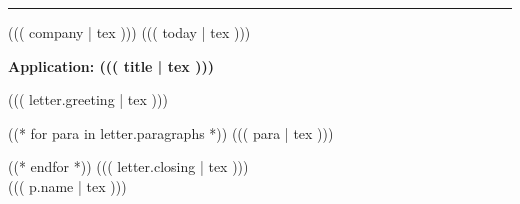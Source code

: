 \documentclass[a4paper,11pt]{article}
\begin{document}
\cvheader
\vspace{-6pt}\noindent\rule{\textwidth}{0.4pt}

\vspace{4pt}
((( company | tex ))) \hfill ((( today | tex )))

\vspace{6pt}
\textbf{Application: ((( title | tex )))}

\vspace{4pt}
((( letter.greeting | tex )))

((* for para in letter.paragraphs *))
((( para | tex )))

((* endfor *))
((( letter.closing | tex ))) \\
((( p.name | tex )))
\end{document}
